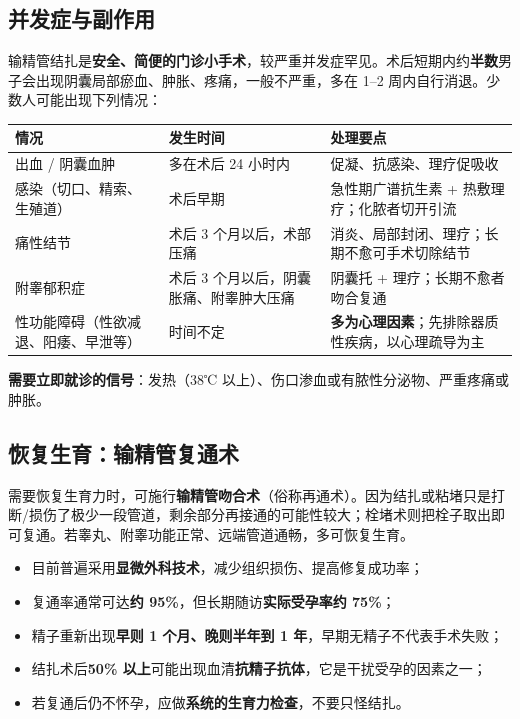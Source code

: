 \documentclass[12pt,UTF8,openany]{ctexbook}
\begin{document}
\subsection*{并发症与副作用}

输精管结扎是\textbf{安全、简便的门诊小手术}，较严重并发症罕见。术后短期内约\textbf{半数}男子会出现阴囊局部瘀血、肿胀、疼痛，一般不严重，多在 1–2 周内自行消退。少数人可能出现下列情况：

\begin{center}
\renewcommand{\arraystretch}{1.3}
\begin{tabularx}{\textwidth}{|X|X|X|}
\hline
\textbf{情况} & \textbf{发生时间} & \textbf{处理要点} \\
\hline
出血 / 阴囊血肿 & 多在术后 24 小时内 & 促凝、抗感染、理疗促吸收 \\
\hline
感染（切口、精索、生殖道） & 术后早期 & 急性期广谱抗生素 + 热敷理疗；化脓者切开引流 \\
\hline
痛性结节 & 术后 3 个月以后，术部压痛 & 消炎、局部封闭、理疗；长期不愈可手术切除结节 \\
\hline
附睾郁积症 & 术后 3 个月以后，阴囊胀痛、附睾肿大压痛 & 阴囊托 + 理疗；长期不愈者吻合复通 \\
\hline
性功能障碍（性欲减退、阳痿、早泄等） & 时间不定 & \textbf{多为心理因素}；先排除器质性疾病，以心理疏导为主 \\
\hline
\end{tabularx}
\end{center}

\textbf{需要立即就诊的信号}：发热（38℃ 以上）、伤口渗血或有脓性分泌物、严重疼痛或肿胀。

\subsection*{恢复生育：输精管复通术}

需要恢复生育力时，可施行\textbf{输精管吻合术}（俗称再通术）。因为结扎或粘堵只是打断/损伤了极少一段管道，剩余部分再接通的可能性较大；栓堵术则把栓子取出即可复通。若睾丸、附睾功能正常、远端管道通畅，多可恢复生育。

\begin{itemize}
  \item 目前普遍采用\textbf{显微外科技术}，减少组织损伤、提高修复成功率；
  \item 复通率通常可达\textbf{约 95\%}，但长期随访\textbf{实际受孕率约 75\%}；
  \item 精子重新出现\textbf{早则 1 个月、晚则半年到 1 年}，早期无精子不代表手术失败；
  \item 结扎术后\textbf{50\% 以上}可能出现血清\textbf{抗精子抗体}，它是干扰受孕的因素之一；
  \item 若复通后仍不怀孕，应做\textbf{系统的生育力检查}，不要只怪结扎。
\end{itemize}
\end{document}
